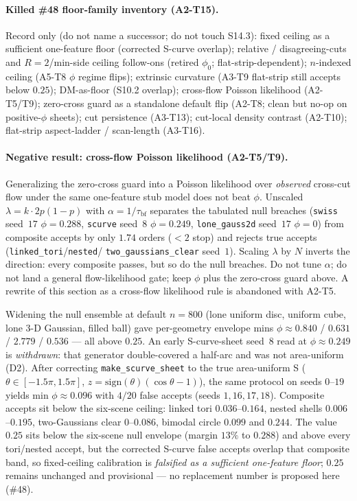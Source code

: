 \documentclass[11pt]{article}
\begin{document}
\paragraph{Killed \#48 floor-family inventory (A2-T15).}
\label{par:si-48-killed-inventory}
Record only (do not name a successor; do not touch S14.3): fixed
ceiling as a sufficient one-feature floor (corrected S-curve overlap);
relative / disagreeing-cuts and $R{=}2$/min-side ceiling follow-ons
(retired $\phi_0$; flat-strip-dependent); $n$-indexed ceiling (A5-T8
$\phi$ regime flips); extrinsic curvature (A3-T9 flat-strip still
accepts below $0.25$); DM-as-floor (S10.2 overlap); cross-flow Poisson
likelihood (A2-T5/T9); zero-cross guard as a standalone default flip
(A2-T8; clean but no-op on positive-$\phi$ sheets); cut persistence
(A3-T13); cut-local density contrast (A2-T10); flat-strip aspect-ladder
/ scan-length (A3-T16).

\paragraph{Negative result: cross-flow Poisson likelihood (A2-T5/T9).}
\label{par:si-cross-flow-poisson-kill}
Generalizing the zero-cross guard into a Poisson likelihood over
\emph{observed} cross-cut flow under the same one-feature stub model
does not beat $\phi$. Unscaled $\lambda=k\cdot 2p(1-p)$ with
$\alpha=1/\tau_{\mathrm{bf}}$ separates the tabulated null breaches
(\texttt{swiss} seed~$17$ $\phi{=}0.288$, \texttt{scurve} seed~$8$
$\phi{=}0.249$, \texttt{lone\_gauss2d} seed~$17$ $\phi{=}0$) from
composite accepts by only $1.74$ orders ($<2$ stop) and rejects true
accepts (\texttt{linked\_tori}/\texttt{nested}/
\texttt{two\_gaussians\_clear} seed~$1$). Scaling $\lambda$ by $N$
inverts the direction: every composite passes, but so do the null
breaches. Do not tune $\alpha$; do not land a general flow-likelihood
gate; keep $\phi$ plus the zero-cross guard above. A rewrite of this
section as a cross-flow likelihood rule is abandoned with A2-T5.

Widening the null ensemble at default $n{=}800$ (lone uniform disc,
uniform cube, lone 3-D Gaussian, filled ball) gave per-geometry
envelope mins $\phi\approx 0.840$ / $0.631$ / $2.779$ / $0.536$ ---
all above $0.25$. An early S-curve-sheet seed~$8$ read at
$\phi\approx 0.249$ is \emph{withdrawn}: that generator double-covered
a half-arc and was not area-uniform (D2). After correcting
\texttt{make\_scurve\_sheet} to the true area-uniform S
($\theta\in[-1.5\pi,1.5\pi]$,
$z=\mathrm{sign}(\theta)(\cos\theta-1)$), the same protocol on seeds
$0$--$19$ yields min $\phi\approx 0.096$ with $4/20$ false accepts
(seeds $1,16,17,18$). Composite accepts sit below the six-scene
ceiling: linked tori $0.036$--$0.164$, nested shells
$0.006$--$0.195$, two-Gaussians clear $0$--$0.086$, bimodal circle
$0.099$ and $0.244$. The value $0.25$ sits below the six-scene null
envelope (margin $13\%$ to $0.288$) and above every tori/nested
accept, but the corrected S-curve false accepts overlap that composite
band, so fixed-ceiling calibration is \emph{falsified as a sufficient
one-feature floor}; $0.25$ remains unchanged and provisional --- no
replacement number is proposed here (\#48).
\end{document}
